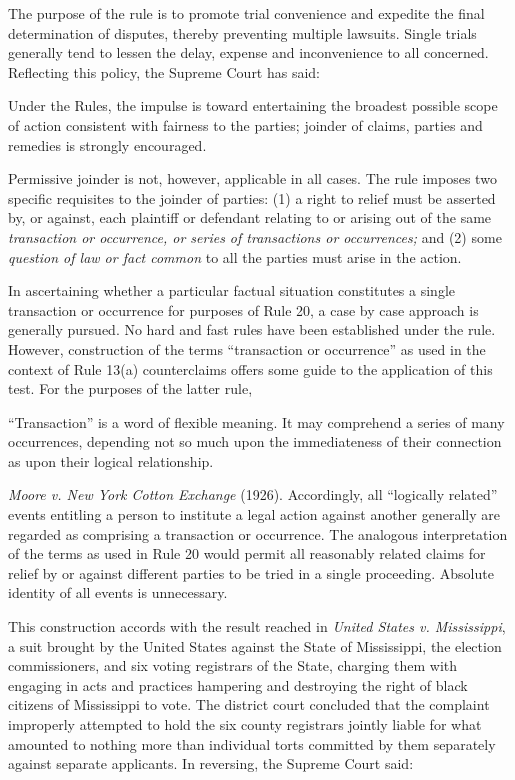 \documentclass[11pt,letterpaper,twoside]{article}
\renewenvironment{quote}{%
   \list{}{%
     \leftmargin2em   %
     \rightmargin\leftmargin\parsep .1em }
   \item\relax
}
{\endlist}
\begin{document}
The purpose of the rule is to promote trial convenience and expedite the
final determination of disputes, thereby preventing multiple lawsuits.
Single trials generally tend to lessen the delay, expense and
inconvenience to all concerned. Reflecting this policy, the Supreme
Court has said:

\begin{quote}
Under the Rules, the impulse is toward entertaining the broadest
possible scope of action consistent with fairness to the parties;
joinder of claims, parties and remedies is strongly encouraged.
\end{quote}

Permissive joinder is not, however, applicable in all cases. The rule
imposes two specific requisites to the joinder of parties: (1) a right
to relief must be asserted by, or against, each plaintiff or defendant
relating to or arising out of the same \emph{transaction or occurrence,
or series of transactions or occurrences;} and (2) some \emph{question
of law or fact common} to all the parties must arise in the action.

In ascertaining whether a particular factual situation constitutes a
single transaction or occurrence for purposes of Rule 20, a case by case
approach is generally pursued. No hard and fast rules have been
established under the rule. However, construction of the terms
``transaction or occurrence'' as used in the context of Rule 13(a)
counterclaims offers some guide to the application of this test. For the
purposes of the latter rule,

\begin{quote}
``Transaction'' is a word of flexible meaning. It may comprehend a
series of many occurrences, depending not so much upon the immediateness
of their connection as upon their logical relationship.
\end{quote}

\emph{Moore v. New York Cotton Exchange} (1926). Accordingly, all
``logically related'' events entitling a person to institute a legal
action against another generally are regarded as comprising a
transaction or occurrence. The analogous interpretation of the terms as
used in Rule 20 would permit all reasonably related claims for relief by
or against different parties to be tried in a single proceeding.
Absolute identity of all events is unnecessary.

This construction accords with the result reached in \emph{United States
v. Mississippi}, a suit brought by the United States against the State
of Mississippi, the election commissioners, and six voting registrars of
the State, charging them with engaging in acts and practices hampering
and destroying the right of black citizens of Mississippi to vote. The
district court concluded that the complaint improperly attempted to hold
the six county registrars jointly liable for what amounted to nothing
more than individual torts committed by them separately against separate
applicants. In reversing, the Supreme Court said:
\end{document}
